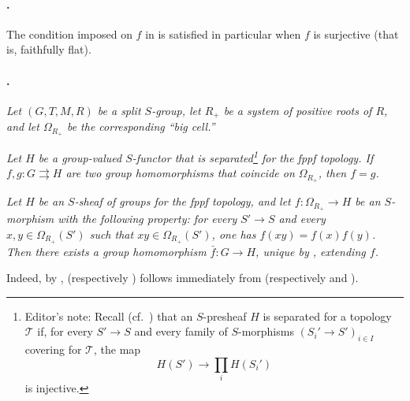 \paragraph{.}
The condition imposed on \(f\) in  is satisfied in particular
when \(f\) is surjective \textup{(that is, faithfully flat)}.

\paragraph{.}
\textit{Let \((G,T,M,R)\) be a split \(S\)-group, let \(R_+\) be a
system of positive roots of \(R\), and let \(\Omega_{R_+}\) be the
corresponding ``big cell.''}

\textit{\textup{} Let \(H\) be a group-valued \(S\)-functor
that is separated\footnote{Editor's note: Recall
\textup{(cf.\ )} that an \(S\)-presheaf \(H\) is
separated for a topology \(\mathcal T\) if, for every
\(S'\to S\) and every family of \(S\)-morphisms
\((S_i'\to S')_{i\in I}\) covering for \(\mathcal T\), the map
\[
  H(S')\longrightarrow\prod_i H(S_i')
\]
is injective.}
for the fppf topology. If
\(f,g:G\rightrightarrows H\) are two group homomorphisms that
coincide on \(\Omega_{R_+}\), then \(f=g\).}

\textit{\textup{} Let \(H\) be an \(S\)-sheaf of groups for the
fppf topology, and let \(f:\Omega_{R_+}\to H\) be an \(S\)-morphism
with the following property: for every \(S'\to S\) and every
\(x,y\in\Omega_{R_+}(S')\) such that
\(xy\in\Omega_{R_+}(S')\), one has
\(f(xy)=f(x)f(y)\). Then there exists a group homomorphism
\(\bar f:G\to H\), unique by \textup{}, extending \(f\).}

Indeed, by , \textup{} \textup{(respectively
\textup{})} follows immediately from 
\textup{(respectively  and )}.

